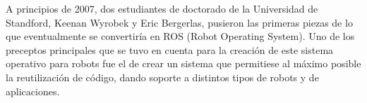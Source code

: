   
  
A principios de 2007, dos estudiantes de doctorado de la Universidad de Standford, Keenan Wyrobek y Eric Bergerlas, pusieron las primeras piezas de lo que eventualmente se convertiría en ROS (Robot Operating System). Uno de los preceptos principales que se tuvo en cuenta para la creación de este sistema operativo para robots fue el de crear un sistema que permitiese al máximo posible la reutilización de código, dando soporte a distintos tipos de robots y de aplicaciones. %
  
